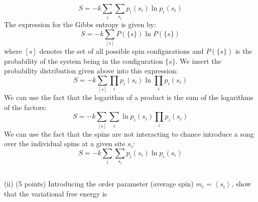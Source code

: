 \documentclass[12pt]{article}
\begin{document}
\begin{equation*}
S=-k \sum_{i} \sum_{s_{i}} p_{i}\left(s_{i}\right) \ln p_{i}\left(s_{i}\right) \tag{1}
\end{equation*}
The expression for the Gibbs entropy is given by:
\begin{equation}
S=-k \sum_{[s] } P(\{s\}) \ln P(\{s\})
\end{equation}
where $[s]$ denotes the set of all possible spin configurations and $P(\{s\})$ is the probability of the system being in the configuration $\{s\}$.
We insert the probability distribution given above into this expression:
\begin{equation}
S=-k \sum_{[s] } \prod_{i} p_{i}\left(s_{i}\right) \ln \prod_{i} p_{i}\left(s_{i}\right)
\end{equation}
We can use the fact that the logarithm of a product is the sum of the logarithms of the factors:
\begin{equation}
S=-k \sum_{[s] } \sum_{i} \ln p_{i}\left(s_{i}\right) \prod_{i} p_{i}\left(s_{i}\right)
\end{equation}
We can use the fact that the spins are not interacting to chance introduce a song over the individual spins at a given site $s_i$:
\begin{equation}
S=-k \sum_{i} \sum_{s_{i}} p_{i}\left(s_{i}\right) \ln p_{i}\left(s_{i}\right)
\end{equation}

\subsection{}
(ii) (5 points) Introducing the order parameter (average spin) $m_{i}=\left\langle s_{i}\right\rangle$, show that the variational free energy is
\end{document}
